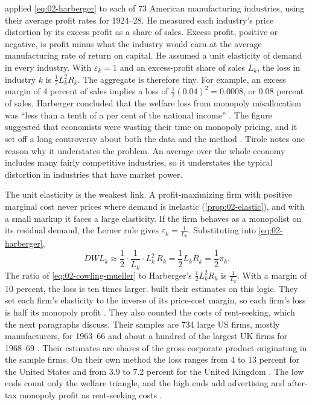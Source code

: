 \citet[pp.~79--82]{Harberger1954} applied \eqref{eq:02-harberger} to each of 73 American manufacturing
industries, using their average profit rates for 1924--28. He measured each industry's price distortion by its
excess profit as a share of sales. Excess profit, positive or negative, is profit minus what the industry would
earn at the average manufacturing rate of return on capital. He assumed a unit elasticity of demand in every
industry.
With $\varepsilon_k = 1$ and an excess-profit share of sales $L_k$, the loss in industry $k$ is
$\frac{1}{2}L_k^2 R_k$. The aggregate is therefore tiny. For example, an excess margin of 4 percent of sales implies
a loss of $\frac{1}{2}(0.04)^2 = 0.0008$, or 0.08 percent of sales. Harberger concluded that the welfare loss from
monopoly misallocation was ``less than a tenth of a per cent of the national income'' \citep[p.~86]{Harberger1954}.
The figure suggested that economists were wasting their time on monopoly pricing, and it set off a long controversy
about both the data and the method \citep[sec.~1.1.1.2]{Tirole1988}. Tirole notes one reason why it understates the problem. An average over the whole economy includes many
fairly competitive industries, so it understates the typical distortion in industries that have market power.

The unit elasticity is the weakest link. A profit-maximizing firm with positive marginal cost never prices where
demand is inelastic (\cref{prop:02-elastic}), and with a small markup it faces a large elasticity. If the firm
behaves as a monopolist on its residual demand, the Lerner rule gives $\varepsilon_k = \frac{1}{L_k}$. Substituting
into \eqref{eq:02-harberger},
\begin{equation}\label{eq:02-cowling-mueller}
\mathit{DWL}_k \approx \frac{1}{2}\cdot\frac{1}{L_k}\cdot L_k^2\, R_k = \frac{1}{2}L_k R_k = \frac{1}{2}\pi_k .
\end{equation}
The ratio of \eqref{eq:02-cowling-mueller} to Harberger's $\frac{1}{2}L_k^2R_k$ is $\frac{1}{L_k}$. With a margin of
10 percent, the loss is ten times larger. \citet{CowlingMueller1978} built their estimates on this logic. They set
each firm's elasticity to the inverse of its price-cost margin, so each firm's loss is half its monopoly profit
\citep[eqs.~(1) and (4), pp.~728--729]{CowlingMueller1978}.
They also counted the costs of rent-seeking, which the next paragraphs discuss. Their samples are 734 large US firms,
mostly manufacturers, for 1963--66 and about a hundred of the largest UK firms for 1968--69 \citep[pp.~738 and
742]{CowlingMueller1978}. Their estimates are shares of the gross corporate product originating in the sample firms.
On their own method the loss ranges from 4 to 13 percent for the United States and from 3.9 to 7.2 percent for the
United Kingdom \citep[pp.~739 and 743]{CowlingMueller1978}. The low ends count only the welfare triangle, and the
high ends add advertising and after-tax monopoly profit as rent-seeking costs \citep[Table~1,
p.~737]{CowlingMueller1978}.

